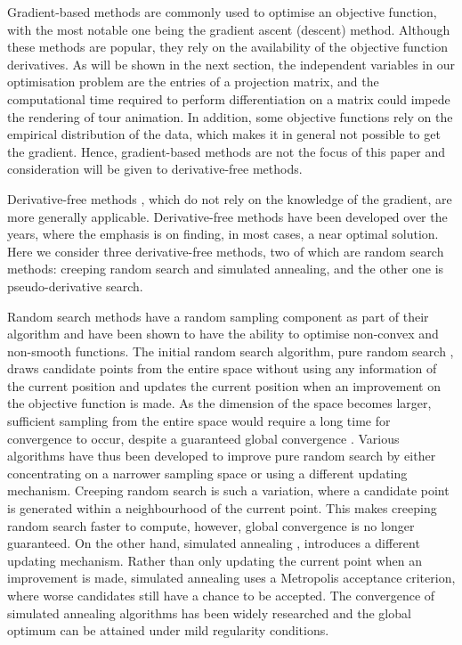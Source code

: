 Gradient-based methods are commonly used to optimise an objective
function, with the most notable one being the gradient ascent (descent)
method. Although these methods are popular, they rely on the
availability of the objective function derivatives. As will be shown in
the next section, the independent variables in our optimisation problem
are the entries of a projection matrix, and the computational time
required to perform differentiation on a matrix could impede the
rendering of tour animation. In addition, some objective functions rely
on the empirical distribution of the data, which makes it in general not
possible to get the gradient. Hence, gradient-based methods are not the
focus of this paper and consideration will be given to derivative-free
methods.

Derivative-free methods
\citep{conn2009introduction, rios2013derivative}, which do not rely on
the knowledge of the gradient, are more generally applicable.
Derivative-free methods have been developed over the years, where the
emphasis is on finding, in most cases, a near optimal solution. Here we
consider three derivative-free methods, two of which are random search
methods: creeping random search and simulated annealing, and the other
one is pseudo-derivative search.

Random search methods
\citep{Romeijn2009, zabinsky2013stochastic, andradottir2015review} have
a random sampling component as part of their algorithm and have been
shown to have the ability to optimise non-convex and non-smooth
functions. The initial random search algorithm, pure random search
\citep{Brooks1958-zk}, draws candidate points from the entire space
without using any information of the current position and updates the
current position when an improvement on the objective function is made.
As the dimension of the space becomes larger, sufficient sampling from
the entire space would require a long time for convergence to occur,
despite a guaranteed global convergence \citep{spall2005introduction}.
Various algorithms have thus been developed to improve pure random
search by either concentrating on a narrower sampling space or using a
different updating mechanism. Creeping random search
\citep{White1971-ci} is such a variation, where a candidate point is
generated within a neighbourhood of the current point. This makes
creeping random search faster to compute, however, global convergence is
no longer guaranteed. On the other hand, simulated annealing
\citep{kirkpatrick1983optimization, bertsimas1993simulated}, introduces
a different updating mechanism. Rather than only updating the current
point when an improvement is made, simulated annealing uses a Metropolis
acceptance criterion, where worse candidates still have a chance to be
accepted. The convergence of simulated annealing algorithms has been
widely researched \citep{mitra1986convergence, granville1994simulated}
and the global optimum can be attained under mild regularity conditions.

